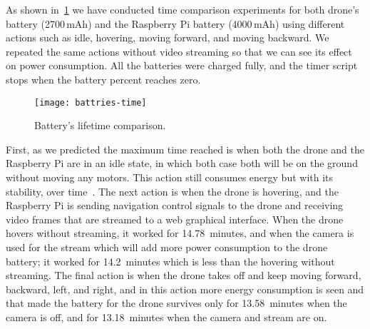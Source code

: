 \documentclass[../main.tex]{subfiles}
\begin{document}
As shown in~\cref{fig:time-comparison} we have 
conducted time comparison experiments for both drone's
battery (2700\,mAh) and the Raspberry Pi battery (4000\,mAh) 
using different actions such as idle, hovering, 
moving forward, and moving backward. We repeated 
the same actions without video streaming so that 
we can see its effect on power consumption. 
All the batteries were charged fully, and the timer 
script stops when the battery percent reaches zero. 

\begin{figure}[tbp]
	\centering
	\texttt{[image: battries-time]}
	\caption{Battery's lifetime comparison.}
	\label{fig:time-comparison}
\end{figure}

First, as we predicted 
the maximum time reached is when both the drone and 
the Raspberry Pi are in an idle state, in which both case both will 
be on the ground without moving any motors.
This action still consumes energy but with 
its stability, over time~\cite{Abey18}. 
The next action is when the drone is hovering, and 
the Raspberry Pi is sending navigation control 
signals to the drone and receiving video frames 
that are streamed to a web graphical interface. 
When the drone hovers without streaming, it worked 
for \SI{14.78}{minutes}, and when the camera is used for 
the stream which will add more power consumption to 
the drone battery; it worked for \SI{14.2}{minutes} which 
is less than the hovering without streaming. The final 
action is when the drone takes off and keep moving 
forward, backward, left, and right, and in this action 
more energy consumption is seen and that made the 
battery for the drone survives only for \SI{13.58}{minutes}
when the camera is off, and for \SI{13.18}{minutes} 
when the camera and stream are on.
\end{document}
